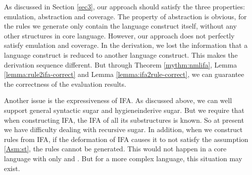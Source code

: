 

As discussed in Section \ref{sec3}, our approach should satisfy the three properties: emulation, abstraction and coverage. The property of abstraction is obvious, for the rules we generate only contain the language construct itself, without any other structures in core language. However, our approach does not perfectly satisfy emulation and coverage. In the derivation, we lost the information that a language construct is reduced to another language construct. This makes the derivation sequence different. But through Theorem \ref{mythm:nmlifa}, Lemma \ref{lemma:rule2ifa-correct} and Lemma \ref{lemma:ifa2rule-correct}, we can guarantee the correctness of the evaluation results.

Another issue is the expressiveness of IFA. As discussed above, we can well support general syntactic sugar and hygieneinderive sugar. But we require that when constructing IFA, the IFA of all its substructures is known. So at present we have difficulty dealing with recursive sugar. In addition, when we construct rules from IFA, if the deformation of IFA causes it to not satisfy the assumption \ref{Asm:st}, the rules cannot be generated. This would not happen in a core language with only  and . But for a more complex language, this situation may exist.
